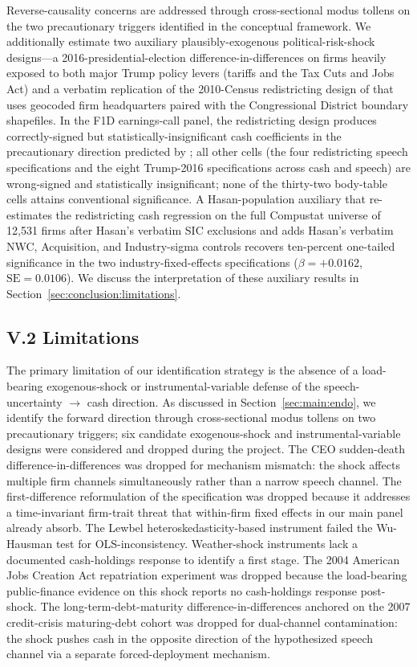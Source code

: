 Reverse-causality concerns are addressed through cross-sectional modus tollens on the two precautionary triggers identified in the conceptual framework. We additionally estimate two auxiliary plausibly-exogenous political-risk-shock designs---a 2016-presidential-election difference-in-differences on firms heavily exposed to both major Trump policy levers (tariffs and the Tax Cuts and Jobs Act) and a verbatim replication of the 2010-Census redistricting design of  that uses geocoded firm headquarters paired with the  Congressional District boundary shapefiles. In the F1D earnings-call panel, the redistricting design produces correctly-signed but statistically-insignificant cash coefficients in the precautionary direction predicted by ; all other cells (the four redistricting speech specifications and the eight Trump-2016 specifications across cash and speech) are wrong-signed and statistically insignificant; none of the thirty-two body-table cells attains conventional significance. A Hasan-population auxiliary that re-estimates the redistricting cash regression on the full Compustat universe of 12{,}531 firms after Hasan's verbatim SIC exclusions and adds Hasan's verbatim NWC, Acquisition, and Industry-sigma controls recovers ten-percent one-tailed significance in the two industry-fixed-effects specifications ($\beta = +0.0162$, $\text{SE} = 0.0106$). We discuss the interpretation of these auxiliary results in Section~\ref{sec:conclusion:limitations}.

\subsection*{V.2 Limitations}
\label{sec:conclusion:limitations}

The primary limitation of our identification strategy is the absence of a load-bearing exogenous-shock or instrumental-variable defense of the speech-uncertainty $\to$ cash direction. As discussed in Section~\ref{sec:main:endo}, we identify the forward direction through cross-sectional modus tollens on two precautionary triggers; six candidate exogenous-shock and instrumental-variable designs were considered and dropped during the project. The CEO sudden-death difference-in-differences was dropped for mechanism mismatch: the shock affects multiple firm channels simultaneously rather than a narrow speech channel. The first-difference reformulation of the  specification was dropped because it addresses a time-invariant firm-trait threat that within-firm fixed effects in our main panel already absorb. The Lewbel heteroskedasticity-based instrument failed the Wu-Hausman test for OLS-inconsistency. Weather-shock instruments lack a documented cash-holdings response to identify a first stage. The 2004 American Jobs Creation Act repatriation experiment was dropped because the load-bearing public-finance evidence on this shock reports no cash-holdings response post-shock. The long-term-debt-maturity difference-in-differences anchored on the 2007 credit-crisis maturing-debt cohort was dropped for dual-channel contamination: the shock pushes cash in the opposite direction of the hypothesized speech channel via a separate forced-deployment mechanism.

